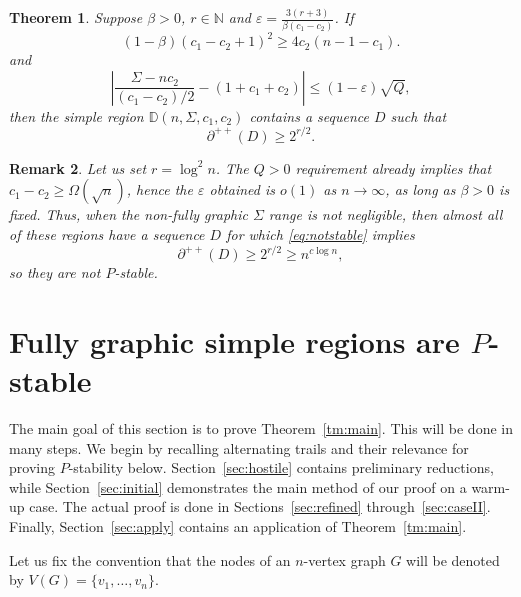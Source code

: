 \documentclass[11pt]{elsarticle}
\theoremstyle{plain}
\newtheorem{theorem}{Theorem}[section]
\newtheorem{remark}[theorem]{Remark\textbf{}}
\theoremstyle{definition}
\def\mD{\mathbb{D}}
\newcommand{\ep}{\varepsilon}
\newcommand{\pppp}[1]{\partial^{++}(#1)}
\begin{document}
\begin{theorem}\label{thm:sigmabound}
    Suppose $\beta > 0$,  $r\in \mathbb N$ and
    $\varepsilon = \tfrac{3(r+3)}{\beta(c_1 - c_2)}$.
    If
    \begin{equation}\label{eq:beta}
        (1-\beta)(c_1 - c_2 + 1)^2 \geq 4c_2(n - 1 - c_1).
    \end{equation}
    and
    \begin{equation}\label{eq:sigma_abs_bound}
    \left| \frac{\Sigma - n c_2}{(c_1 - c_2)/2} - (1 + c_1 + c_2) \right|
        \leq (1 - \varepsilon)\sqrt{Q},
    \end{equation}
    then
     the simple region $\mD(n,\Sigma,c_1,c_2)$ contains a sequence $D$ such that
    \begin{equation}\label{eq:notstable}
       \pppp D \ge  2^{r/2}.
        \end{equation}
        \end{theorem}

\begin{remark}
  Let us set $r = \log^2 n$. The $Q >0$ requirement already implies that $c_1 -c_2 \geq \Omega(\sqrt{n})$, hence the $\ep$ obtained is $o(1)$ as $n\to \infty$, as long as  $\beta > 0$ is fixed.  Thus, when the non-fully graphic $\Sigma$ range is not negligible, then almost all of these regions have a sequence $D$ for which \eqref{eq:notstable} implies
    \[\partial^{++}(D) \geq 2^{r/2} \geq n^{c\log n},
    \] so they are not $P$-stable.
\end{remark}


\section{Fully graphic simple regions are $P$-stable}\label{sec:fgps}

The main goal of this section is  to prove Theorem~\ref{tm:main}. This will be done in many steps. We begin by recalling alternating trails and their relevance for proving $P$-stability below. Section~\ref{sec:hostile} contains preliminary reductions, while Section~\ref{sec:initial} demonstrates the main method of our proof on a warm-up case. The actual proof is done in Sections~\ref{sec:refined} through~\ref{sec:caseII}. Finally, Section~\ref{sec:apply} contains an application of Theorem~\ref{tm:main}.


Let us fix the convention that the nodes of an $n$-vertex graph $G$ will be denoted by $V(G)=\{v_1,\dots, v_n\}$.
\end{document}
